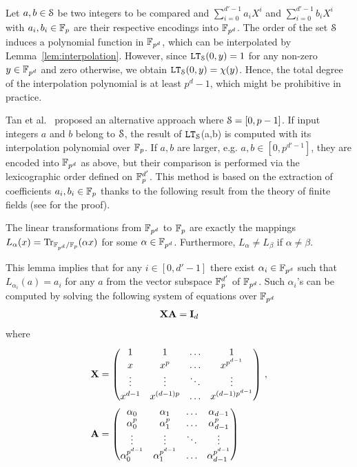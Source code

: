   Let $a,b \in \S$ be two integers to be compared and $\sum_{i=0}^{d'-1} a_i X^i$ and $\sum_{i=0}^{d'-1} b_i X^i$ with $a_i, b_i \in \F_p$ are their respective encodings into $\F_{p^d}$.
  The order of the set $\S$ induces a polynomial function in $\F_{p^d}$, which can be interpolated by Lemma~\ref{lem:interpolation}.
  However, since $\LT_\S(0,y) = 1$ for any non-zero $y \in \F_{p^d}$ and zero otherwise, we obtain $\LT_\S(0,y) = \chi(y)$.
  Hence, the total degree of the interpolation polynomial is at least $p^d-1$, 
  which might be prohibitive in practice.

  Tan et al.~\cite{TLWRK20} proposed an alternative approach where $\S = [0,p-1]$.
  If input integers $a$ and $b$ belong to $\S$, the result of $\LT_\S$(a,b) is computed with its interpolation polynomial over $\F_p$.  
  If $a,b$ are larger, e.g. $a,b \in [0,p^{d'-1}]$, they are encoded into $\F_{p^d}$ as above, but their comparison is performed via the lexicographic order defined on $\F_p^{d'}$.
  This method is based on the extraction of coefficients $a_i, b_i \in \F_p$ thanks to the following result from the theory of finite fields (see \cite[Theorem 2.24]{LN86} for the proof).
  \begin{lemma}\label{lem:extraction}
    The linear transformations from $\F_{p^d}$ to $\F_p$ are exactly the mappings $L_{\alpha}(x) = \Tr_{\F_{p^d}/\F_p}(\alpha x)$ for some $\alpha \in \F_{p^d}$.
    Furthermore, $L_{\alpha} \ne L_{\beta}$ if $\alpha \ne \beta$.
  \end{lemma}
  This lemma implies that for any $i \in [0,d'-1]$ there exist $\alpha_i \in \F_{p^d}$ such that $L_{\alpha_i}(a) = a_i$ for any $a$ from the vector subspace $\F_p^{d'}$ of $\F_{p^d}$.
  Such $\alpha_i$'s can be computed by solving the following system of equations over $\F_{p^d}$ 
  \begin{align*}
    \mX \mA
    =
    \mI_{d}
  \end{align*}
  where
  \begin{align*}
  \mX &= \begin{pmatrix}
      1       & 1       & \dots   & 1             \\
      x       & x^p     & \dots   & x^{p^{d-1}}   \\
      \vdots  & \vdots  & \ddots  & \vdots        \\
      x^{d-1}     & x^{(d-1)p}    & \dots   & x^{(d-1)p^{d-1}}  \\
    \end{pmatrix}\,,
    \\
    \mA &= \begin{pmatrix}
      \alpha_0      & \alpha_1      & \dots   & \alpha_{d-1}      \\
      \alpha_0^{p}  & \alpha_1^{p}  & \dots   & \alpha_{d-1}^{p}  \\
      \vdots        & \vdots        & \ddots  & \vdots            \\
      \alpha_0^{p^{d-1}}  & \alpha_1^{p^{d-1}}  & \dots   & \alpha_{d-1}^{p^{d-1}}  \\
    \end{pmatrix}
  \end{align*}
